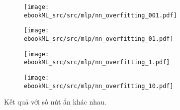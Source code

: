 \begin{figure}[t]
    \begin{subfigure}{0.45\textwidth}
    \texttt{[image: ebookML\_src/src/mlp/nn\_overfitting\_001.pdf]}
    \caption{}
    \end{subfigure}
    \begin{subfigure}{0.45\textwidth}
    \texttt{[image: ebookML\_src/src/mlp/nn\_overfitting\_01.pdf]}
    \caption{}
    \end{subfigure}

    \begin{subfigure}{0.45\textwidth}
    \texttt{[image: ebookML\_src/src/mlp/nn\_overfitting\_1.pdf]}
    \caption{}
    \end{subfigure}
    \begin{subfigure}{0.45\textwidth}
    \texttt{[image: ebookML\_src/src/mlp/nn\_overfitting\_10.pdf]}
    \caption{}
    \end{subfigure}
    \caption{
     Kết quả với số nút ẩn khác nhau.
    }
    \label{fig:14_11}
\end{figure}


 
 
 
 
 
  
